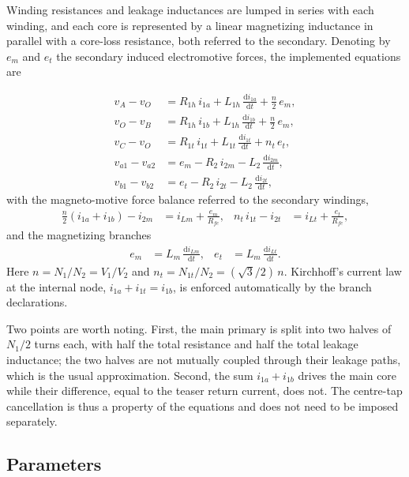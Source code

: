 \documentclass[11pt,a4paper]{article}
\begin{document}
Winding resistances and leakage inductances are lumped in series with each
winding, and each core is represented by a linear magnetizing inductance in
parallel with a core-loss resistance, both referred to the secondary. Denoting
by $e_m$ and $e_t$ the secondary induced electromotive forces, the implemented
equations are

\begin{align}
v_A - v_O &= R_{1h}\,i_{1a} + L_{1h}\,\frac{\mathrm{d}i_{1a}}{\mathrm{d}t}
             + \frac{n}{2}\,e_m ,\\[2pt]
v_O - v_B &= R_{1h}\,i_{1b} + L_{1h}\,\frac{\mathrm{d}i_{1b}}{\mathrm{d}t}
             + \frac{n}{2}\,e_m ,\\[2pt]
v_C - v_O &= R_{1t}\,i_{1t} + L_{1t}\,\frac{\mathrm{d}i_{1t}}{\mathrm{d}t}
             + n_t\,e_t ,\\[2pt]
v_{a1} - v_{a2} &= e_m - R_2\,i_{2m}
             - L_2\,\frac{\mathrm{d}i_{2m}}{\mathrm{d}t} ,\\[2pt]
v_{b1} - v_{b2} &= e_t - R_2\,i_{2t}
             - L_2\,\frac{\mathrm{d}i_{2t}}{\mathrm{d}t} ,
\end{align}
with the magneto-motive force balance referred to the secondary windings,
\begin{align}
\frac{n}{2}\left(i_{1a} + i_{1b}\right) - i_{2m}
   &= i_{Lm} + \frac{e_m}{R_{fe}} , &
n_t\,i_{1t} - i_{2t} &= i_{Lt} + \frac{e_t}{R_{fe}} ,
\end{align}
and the magnetizing branches
\begin{align}
e_m &= L_m\,\frac{\mathrm{d}i_{Lm}}{\mathrm{d}t} , &
e_t &= L_m\,\frac{\mathrm{d}i_{Lt}}{\mathrm{d}t} .
\end{align}
Here $n = N_1/N_2 = V_1/V_2$ and $n_t = N_{1t}/N_2 = (\sqrt{3}/2)\,n$.
Kirchhoff's current law at the internal node,
$i_{1a} + i_{1t} = i_{1b}$, is enforced automatically by the branch
declarations.

Two points are worth noting. First, the main primary is split into two halves
of $N_1/2$ turns each, with half the total resistance and half the total
leakage inductance; the two halves are not mutually coupled through their
leakage paths, which is the usual approximation. Second, the sum
$i_{1a}+i_{1b}$ drives the main core while their difference, equal to the
teaser return current, does not. The centre-tap cancellation is thus a property
of the equations and does not need to be imposed separately.

\subsection{Parameters}
\end{document}
